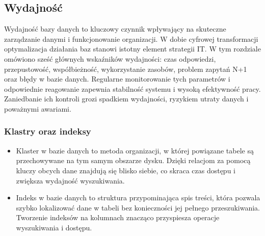 \documentclass[letterpaper,10pt,polish]{sphinxmanual}
\begin{document}
\subsection{Wydajność}
\label{\detokenize{rozdzial2/Wydajnosc_Skalowanie_i_Replikacja/index:wydajnosc}}
\sphinxAtStartPar
Wydajność bazy danych to kluczowy czynnik wpływający na skuteczne zarządzanie danymi i funkcjonowanie organizacji. W dobie cyfrowej transformacji optymalizacja działania baz stanowi istotny element strategii IT. W tym rozdziale omówiono sześć głównych wskaźników wydajności: czas odpowiedzi, przepustowość, współbieżność, wykorzystanie zasobów, problem zapytań N+1 oraz błędy w bazie danych. Regularne monitorowanie tych parametrów i odpowiednie reagowanie zapewnia stabilność systemu i wysoką efektywność pracy. Zaniedbanie ich kontroli grozi spadkiem wydajności, ryzykiem utraty danych i poważnymi awariami.


\subsubsection{Klastry oraz indeksy}
\label{\detokenize{rozdzial2/Wydajnosc_Skalowanie_i_Replikacja/index:klastry-oraz-indeksy}}\begin{itemize}
\item {} 
\sphinxAtStartPar
Klaster w bazie danych to metoda organizacji, w której powiązane tabele są przechowywane na tym samym obszarze dysku. Dzięki relacjom za pomocą kluczy obcych dane znajdują się blisko siebie, co skraca czas dostępu i zwiększa wydajność wyszukiwania.

\item {} 
\sphinxAtStartPar
Indeks w bazie danych to struktura przypominająca spis treści, która pozwala szybko lokalizować dane w tabeli bez konieczności jej pełnego przeszukiwania. Tworzenie indeksów na kolumnach znacząco przyspiesza operacje wyszukiwania i dostępu.

\end{itemize}
\end{document}
